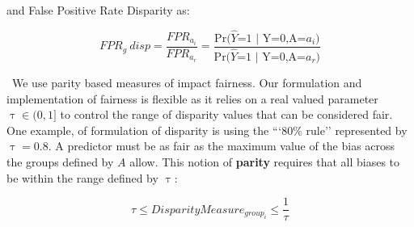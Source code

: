 and False Positive Rate Disparity as: 

\begin{equation}
FPR_g \ disp = \frac{FPR_{a_i}}{FPR_{a_r}} = \frac{\text{Pr(}\widehat{Y}\text{=1 | Y=0,A=}a_i) }{\text{Pr(}\widehat{Y}\text{=1 | Y=0,A=}a_r) }
\end{equation}


\
We use parity based measures of impact fairness. Our formulation and implementation of fairness is flexible as it relies on a real valued parameter $\uptau \in (0,1] $ to control the range of disparity values that can be considered fair. One example, of formulation of disparity is using the ```80\% rule'' represented by $\uptau = 0.8$. A predictor must be as fair as the maximum value of the bias across the groups defined by $A$ allow. This notion of \textbf{parity} requires that all biases to be within the range defined by $\uptau$:

\begin{equation}
\tau \leq Disparity Measure_{group_i} \leq \frac{1}{\tau}
\end{equation}


